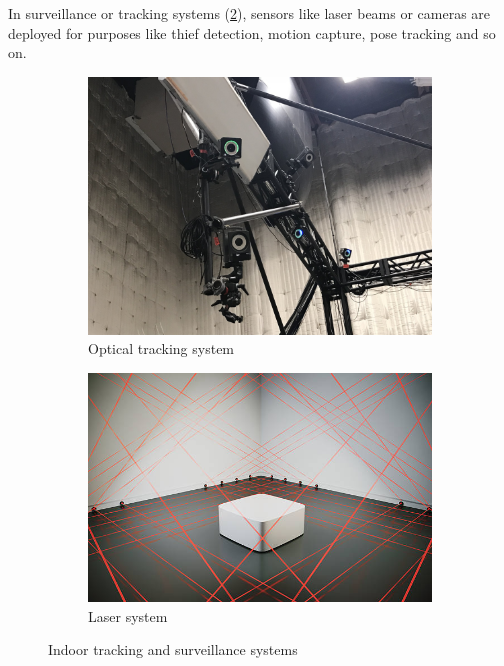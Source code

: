 In surveillance or tracking systems (\ref{fig:intro-laser}), 
sensors like laser beams or cameras are deployed for purposes like thief detection, 
motion capture, pose tracking and so on. 
\begin{figure}[ht] 
    \centering 
    
    \begin{subfigure}[b]{0.41\textwidth} 
        \includegraphics[width=\textwidth]{figures/optitrack.jpg} 
        \caption{Optical tracking system} 
        \label{fig:intro-optitrack} 
    \end{subfigure} 
    \hfill
    \begin{subfigure} [b]{0.46\textwidth} 
        \includegraphics[width=\textwidth]{figures/laser.jpg} 
        \caption{Laser system} 
        \label{fig:intro-laser} 
    \end{subfigure} 
    \caption{Indoor tracking and surveillance systems}
    \label{fig:intro-indoor}
\end{figure}

